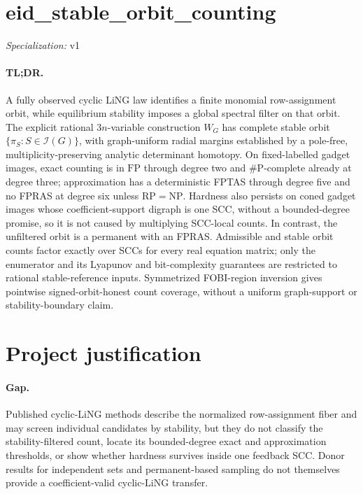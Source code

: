 \documentclass{article}
\begin{document}
\sloppy

\section*{eid\_\allowbreak{}stable\_\allowbreak{}orbit\_\allowbreak{}counting}

\noindent\textit{Specialization:} v1\par

\paragraph{TL;DR.} A fully observed cyclic LiNG law identifies a finite monomial row-assignment orbit, while equilibrium stability imposes a global spectral filter on that orbit. The explicit rational \(3n\)-variable construction \(W_G\) has complete stable orbit \(\{\pi_S:S\in\mathcal I(G)\}\), with graph-uniform radial margins established by a pole-free, multiplicity-preserving analytic determinant homotopy. On fixed-labelled gadget images, exact counting is in \(\mathrm{FP}\) through degree two and \(\#\mathrm P\)-complete already at degree three; approximation has a deterministic FPTAS through degree five and no FPRAS at degree six unless \(\mathrm{RP}=\mathrm{NP}\). Hardness also persists on coned gadget images whose coefficient-support digraph is one SCC, without a bounded-degree promise, so it is not caused by multiplying SCC-local counts. In contrast, the unfiltered orbit is a permanent with an FPRAS. Admissible and stable orbit counts factor exactly over SCCs for every real equation matrix; only the enumerator and its Lyapunov and bit-complexity guarantees are restricted to rational stable-reference inputs. Symmetrized FOBI-region inversion gives pointwise signed-orbit-honest count coverage, without a uniform graph-support or stability-boundary claim.

\section{Project justification}

\paragraph{Gap.} Published cyclic-LiNG methods describe the normalized row-assignment fiber and may screen individual candidates by stability, but they do not classify the stability-filtered count, locate its bounded-degree exact and approximation thresholds, or show whether hardness survives inside one feedback SCC. Donor results for independent sets and permanent-based sampling do not themselves provide a coefficient-valid cyclic-LiNG transfer.
\end{document}
